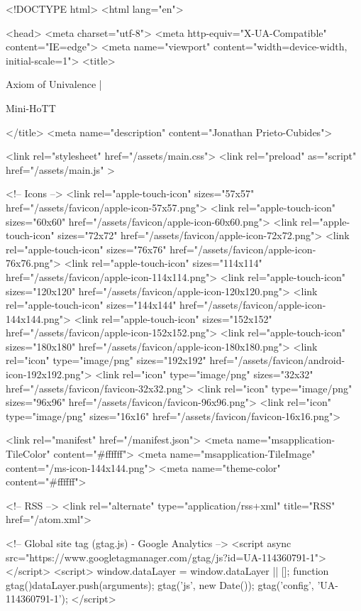 <!DOCTYPE html>
<html lang="en">

<head>
  <meta charset="utf-8">
  <meta http-equiv="X-UA-Compatible" content="IE=edge">
  <meta name="viewport" content="width=device-width, initial-scale=1">
  <title>
    
      
        Axiom of Univalence |
      
        Mini-HoTT
    
  </title>
  <meta name="description" content="Jonathan Prieto-Cubides">

  <link rel="stylesheet" href="/assets/main.css">
  <link rel="preload" as="script" href="/assets/main.js" >

  <!-- Icons -->
  <link rel="apple-touch-icon" sizes="57x57" href="/assets/favicon/apple-icon-57x57.png">
  <link rel="apple-touch-icon" sizes="60x60" href="/assets/favicon/apple-icon-60x60.png">
  <link rel="apple-touch-icon" sizes="72x72" href="/assets/favicon/apple-icon-72x72.png">
  <link rel="apple-touch-icon" sizes="76x76" href="/assets/favicon/apple-icon-76x76.png">
  <link rel="apple-touch-icon" sizes="114x114" href="/assets/favicon/apple-icon-114x114.png">
  <link rel="apple-touch-icon" sizes="120x120" href="/assets/favicon/apple-icon-120x120.png">
  <link rel="apple-touch-icon" sizes="144x144" href="/assets/favicon/apple-icon-144x144.png">
  <link rel="apple-touch-icon" sizes="152x152" href="/assets/favicon/apple-icon-152x152.png">
  <link rel="apple-touch-icon" sizes="180x180" href="/assets/favicon/apple-icon-180x180.png">
  <link rel="icon" type="image/png" sizes="192x192"  href="/assets/favicon/android-icon-192x192.png">
  <link rel="icon" type="image/png" sizes="32x32" href="/assets/favicon/favicon-32x32.png">
  <link rel="icon" type="image/png" sizes="96x96" href="/assets/favicon/favicon-96x96.png">
  <link rel="icon" type="image/png" sizes="16x16" href="/assets/favicon/favicon-16x16.png">

  <link rel="manifest" href="/manifest.json">
  <meta name="msapplication-TileColor" content="#ffffff">
  <meta name="msapplication-TileImage" content="/ms-icon-144x144.png">
  <meta name="theme-color" content="#ffffff">

  <!-- RSS -->
  <link rel="alternate" type="application/rss+xml" title="RSS" href="/atom.xml">

  <!-- Global site tag (gtag.js) - Google Analytics -->
  <script async src="https://www.googletagmanager.com/gtag/js?id=UA-114360791-1"></script>
  <script>
    window.dataLayer = window.dataLayer || [];
    function gtag(){dataLayer.push(arguments);}
    gtag('js', new Date());
    gtag('config', 'UA-114360791-1');
  </script>


